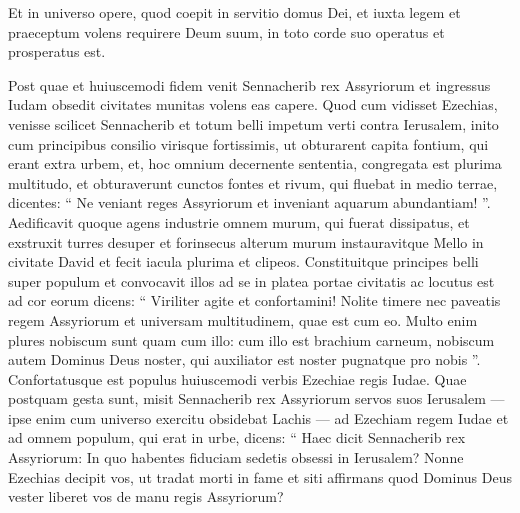 \begin{biblechapter}
\begin{biblechapter}
\begin{biblechapter}
\begin{biblechapter}
\begin{biblechapter}
\begin{biblechapter}
\begin{biblechapter}
\begin{biblechapter}
\begin{biblechapter}
\begin{biblechapter}
\begin{biblechapter}
\begin{biblechapter}
\begin{biblechapter}
\begin{biblechapter}
\begin{biblechapter}
\begin{biblechapter}
\begin{biblechapter}
\begin{biblechapter}
\begin{biblechapter}
\begin{biblechapter}
\begin{biblechapter}
\begin{biblechapter}
\begin{biblechapter}
\begin{biblechapter}
\begin{biblechapter}
\begin{biblechapter}
\begin{biblechapter}
\begin{biblechapter}
\begin{biblechapter}
\begin{biblechapter}
\begin{biblechapter}
\verse Et in universo opere, quod coepit in servitio domus Dei, et iuxta legem et praeceptum volens requirere Deum suum, in toto corde suo operatus et prosperatus est.
 
\begin{biblechapter}
\verse Post quae et huiuscemodi fidem venit Sennacherib rex Assyriorum et ingressus Iudam obsedit civitates munitas volens eas capere.
 \verse Quod cum vidisset Ezechias, venisse scilicet Sennacherib et totum belli impetum verti contra Ierusalem, 
\verse inito cum principibus consilio virisque fortissimis, ut obturarent capita fontium, qui erant extra urbem, et, hoc omnium decernente sententia, 
\verse congregata est plurima multitudo, et obturaverunt cunctos fontes et rivum, qui fluebat in medio terrae, dicentes: “ Ne veniant reges Assyriorum et inveniant aquarum abundantiam! ”. 
\verse Aedificavit quoque agens industrie omnem murum, qui fuerat dissipatus, et exstruxit turres desuper et forinsecus alterum murum instauravitque Mello in civitate David et fecit iacula plurima et clipeos. 
\verse Constituitque principes belli super populum et convocavit illos ad se in platea portae civitatis ac locutus est ad cor eorum dicens: 
\verse “ Viriliter agite et confortamini! Nolite timere nec paveatis regem Assyriorum et universam multitudinem, quae est cum eo. Multo enim plures nobiscum sunt quam cum illo: 
\verse cum illo est brachium carneum, nobiscum autem Dominus Deus noster, qui auxiliator est noster pugnatque pro nobis ”. Confortatusque est populus huiuscemodi verbis Ezechiae regis Iudae.
 \verse Quae postquam gesta sunt, misit Sennacherib rex Assyriorum servos suos Ierusalem — ipse enim cum universo exercitu obsidebat Lachis — ad Ezechiam regem Iudae et ad omnem populum, qui erat in urbe, dicens: 
\verse “ Haec dicit Sennacherib rex Assyriorum: In quo habentes fiduciam sedetis obsessi in Ierusalem? 
\verse Nonne Ezechias decipit vos, ut tradat morti in fame et siti affirmans quod Dominus Deus vester liberet vos de manu regis Assyriorum? 

\end{biblechapter}
\end{biblechapter}
\end{biblechapter}
\end{biblechapter}
\end{biblechapter}
\end{biblechapter}
\end{biblechapter}
\end{biblechapter}
\end{biblechapter}
\end{biblechapter}
\end{biblechapter}
\end{biblechapter}
\end{biblechapter}
\end{biblechapter}
\end{biblechapter}
\end{biblechapter}
\end{biblechapter}
\end{biblechapter}
\end{biblechapter}
\end{biblechapter}
\end{biblechapter}
\end{biblechapter}
\end{biblechapter}
\end{biblechapter}
\end{biblechapter}
\end{biblechapter}
\end{biblechapter}
\end{biblechapter}
\end{biblechapter}
\end{biblechapter}
\end{biblechapter}
\end{biblechapter}
